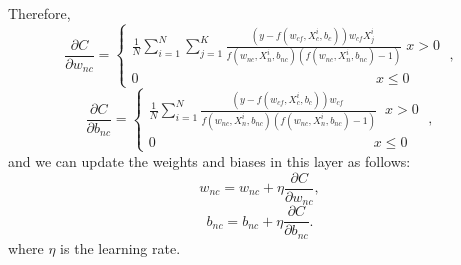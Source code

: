 \documentclass{sig-alternate-05-2015}
\begin{document}
Therefore,
\begin{equation}\label{}
\frac{{\partial C}}{{\partial {w_{nc}}}} = \left\{ \begin{array}{l}
\frac{1}{N}\sum\limits_{i = 1}^N {\sum\limits_{j = 1}^K {\frac{{\left( {y - f({w_{cf}},X_c^i,{b_c})} \right){w_{cf}}X_j^i\;}}{{f({w_{nc}},X_n^i,{b_{nc}})\left( {{f}({w_{nc}},X_n^i,{b_{nc}}) - 1} \right)}}} } \;x > 0\;\\
0\;\;\;\;\;\;\;\;\;\;\;\;\;\;\;\;\;\;\;\;\;\;\;\;\;\;\;\;\;\;\;\;\;\;\;\;\;\;\;\;\;\;\;\;\;\;\;\;\;\;\;\;\;\;\;\;\;\;\;\;\;x \le 0
\end{array} \right.,
\end{equation}
\begin{equation}\label{}
\frac{{\partial C}}{{\partial {b_{nc}}}} = \left\{ \begin{array}{l}
\frac{1}{N}\sum\limits_{i = 1}^N {\frac{{\left( {y - f({w_{cf}},X_c^i,{b_c})} \right){w_{cf}}\;}}{{f({w_{nc}},X_n^i,{b_{nc}})\left( {f({w_{nc}},X_n^i,{b_{nc}}) - 1} \right)}}} \;\;x > 0\;\\
0\;\;\;\;\;\;\;\;\;\;\;\;\;\;\;\;\;\;\;\;\;\;\;\;\;\;\;\;\;\;\;\;\;\;\;\;\;\;\;\;\;\;\;\;\;\;\;\;\;\;\;\;\;\;\;\;x \le 0
\end{array} \right.,
\end{equation}
and we can update the weights and biases in this layer as follows:
\begin{equation}\label{}
{w_{nc}} = {w_{nc}} + \eta \frac{{\partial C}}{{\partial {w_{nc}}}},
\end{equation}
\begin{equation}\label{}
{b_{nc}} = {b_{nc}} + \eta \frac{{\partial C}}{{\partial {b_{nc}}}}.
\end{equation}
where $\eta$ is the learning rate.
\end{document}

